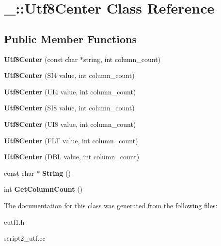 \hypertarget{class___1_1_utf8_center}{}\section{\+\_\+\+:\+:Utf8\+Center Class Reference}
\label{class___1_1_utf8_center}
\subsection*{Public Member Functions}
\begin{DoxyCompactItemize}
\item 
\mbox{\label{class___1_1_utf8_center_ad5e858bf3824593671c566c5d14a43a5}} 
{\bfseries Utf8\+Center} (const char $\ast$string, int column\+\_\+count)
\item 
\mbox{\label{class___1_1_utf8_center_a9b92822c7e89e698c7290df5ba51c013}} 
{\bfseries Utf8\+Center} (S\+I4 value, int column\+\_\+count)
\item 
\mbox{\label{class___1_1_utf8_center_ae40b2338ee2e32a00a9a4e514fbb6236}} 
{\bfseries Utf8\+Center} (U\+I4 value, int column\+\_\+count)
\item 
\mbox{\label{class___1_1_utf8_center_af607fa10a6d81b526be6ab778929d7fb}} 
{\bfseries Utf8\+Center} (S\+I8 value, int column\+\_\+count)
\item 
\mbox{\label{class___1_1_utf8_center_aa1e81b57e33c0ce5c07be9117a7bb39c}} 
{\bfseries Utf8\+Center} (U\+I8 value, int column\+\_\+count)
\item 
\mbox{\label{class___1_1_utf8_center_a2fdb089f1029fb8a6aa504a75e4c50d0}} 
{\bfseries Utf8\+Center} (F\+LT value, int column\+\_\+count)
\item 
\mbox{\label{class___1_1_utf8_center_a7b1068a4c47be97866e800bce65b9dcb}} 
{\bfseries Utf8\+Center} (D\+BL value, int column\+\_\+count)
\item 
\mbox{\label{class___1_1_utf8_center_a6dd6751c749bfcd6993ddf7bfffe05fa}} 
const char $\ast$ {\bfseries String} ()
\item 
\mbox{\label{class___1_1_utf8_center_a2a40b1dbbada10b48944aa4d5e47f42f}} 
int {\bfseries Get\+Column\+Count} ()
\end{DoxyCompactItemize}


The documentation for this class was generated from the following files\+:\begin{DoxyCompactItemize}
\item 
cutf1.\+h\item 
script2\+\_\+utf.\+cc\end{DoxyCompactItemize}

